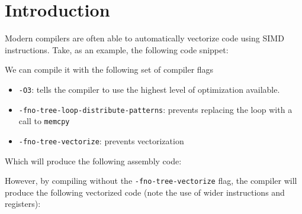 \documentclass[acmsmall,review, nonacm]{acmart}
\begin{document}



\maketitle

\section{Introduction}
Modern compilers are often able to automatically vectorize code using 
SIMD instructions.
Take, as an example, the following code snippet: 



\noindent We can compile it with the following set of compiler flags
\begin{itemize}
  \item \texttt{-O3}: tells the compiler to use the highest level
        of optimization available.
  \item \texttt{-fno-tree-loop-distribute-patterns}:
        prevents replacing the loop with a call to \texttt{memcpy}
  \item \texttt{-fno-tree-vectorize}: prevents vectorization
\end{itemize}

\noindent Which will produce the following assembly code:



\noindent However, by compiling without the \texttt{-fno-tree-vectorize} flag,
the compiler will produce the following vectorized code (note the use of wider instructions and registers):
\end{document}
